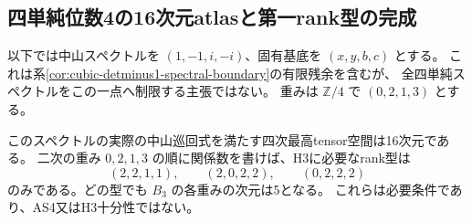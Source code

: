 \subsection{四単純位数4の16次元atlasと第一rank型の完成}
\label{subsec:cubic-four-simple-order4-rankC}
以下では中山スペクトルを $(1,-1,i,-i)$、固有基底を $(x,y,b,c)$ とする。
これは系\ref{cor:cubic-detminus1-spectral-boundary}の有限残余を含むが、
全四単純スペクトルをこの一点へ制限する主張ではない。
重みは $\mathbb Z/4$ で $(0,2,1,3)$ とする。

\begin{proposition}[元16tensorと三つの必要rank型]
\label{prop:cubic-four-simple-order4-atlas}
このスペクトルの実際の中山巡回式を満たす四次最高tensor空間は16次元である。
二次の重み $0,2,1,3$ の順に関係数を書けば、H3に必要なrank型は
\[
 (2,2,1,1),\qquad (2,0,2,2),\qquad (0,2,2,2)
\]
のみである。どの型でも $B_3$ の各重みの次元は5となる。
これらは必要条件であり、AS4又はH3十分性ではない。
\end{proposition}
